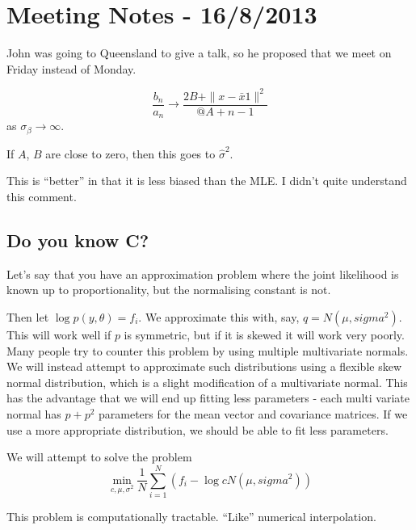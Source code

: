 \documentclass{amsart}
\begin{document}
\section{Meeting Notes - 16/8/2013}
John was going to Queensland to give a talk, so he proposed that we meet on Friday instead of Monday.

\[
\frac{b_n}{a_n} \to \frac{2B+ \|x - \bar{x} 1\|^2}{@A + n-1}
\]
as $\sigma_\beta \to \infty$.

If $A$, $B$ are close to zero, then this goes to $\hat{\sigma}^2$.

This is ``better'' in that it is less biased than the MLE. I didn't quite understand this
comment.

\subsection{Do you know C?}
Let's say that you have an approximation problem where the joint likelihood is known up to
proportionality, but the normalising constant is not.

Then let $\log{p(y, \theta)} = f_i$. We approximate this with, say, $q=N(\mu, sigma^2)$.
This will work well if $p$ is symmetric, but if it is skewed it will work very poorly. Many
people try to counter this problem by using multiple multivariate normals. We will instead
attempt to approximate such distributions using a flexible skew normal distribution, which is
a slight modification of a multivariate normal. This has the advantage that we will end up
fitting less parameters - each multi variate normal has $p + p^2$ parameters for the
mean vector and covariance matrices. If we use a more appropriate distribution, we should
be able to fit less parameters.

We will attempt to solve the problem
\[
	\min_{c, \mu, \sigma^2} \frac{1}{N} \sum_{i=1}^N (f_i - \log{c N(\mu, sigma^2)})
\]

This problem is computationally tractable. ``Like'' numerical interpolation.
\end{document}
